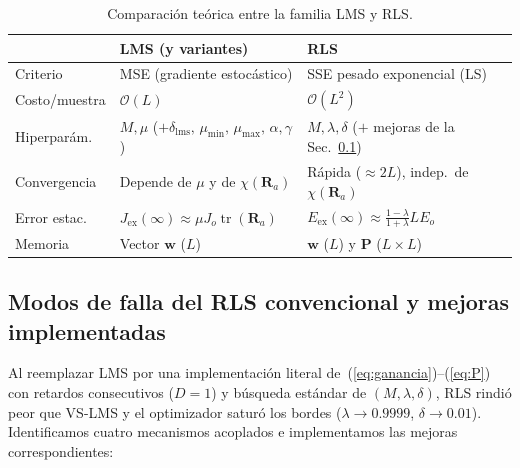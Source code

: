 \documentclass[conference]{IEEEtran}
\begin{document}
\begin{table}[!t]
    \centering
    \caption{Comparación teórica entre la familia LMS y RLS.}
    \label{tab:comparacion}
    \footnotesize
    \setlength{\tabcolsep}{2.5pt}
    \begin{tabular}{@{}lp{2.80cm}p{2.95cm}@{}}
        \toprule
        & \textbf{LMS (y variantes)} & \textbf{RLS} \tabularnewline
        \midrule
        Criterio & {\raggedright MSE (gradiente estocástico)} & {\raggedright SSE pesado exponencial (LS)} \tabularnewline
        Costo/muestra & $\mathcal{O}(L)$ & $\mathcal{O}(L^2)$ \tabularnewline
        Hiperparám. & {\raggedright $M,\mu$ ($+\delta_{\text{lms}},\allowbreak\,\mu_{\min},\allowbreak\,\mu_{\max},\allowbreak\,\alpha,\gamma$)} & {\raggedright $M,\lambda,\delta$ ($+$ mejoras de la Sec.~\ref{sec:rls_impl})} \tabularnewline
        Convergencia & {\raggedright Depende de $\mu$ y de $\chi(\mathbf{R}_a)$} & {\raggedright Rápida ($\approx 2L$), indep.\ de $\chi(\mathbf{R}_a)$} \tabularnewline
        Error estac. & {\raggedright $J_{\text{ex}}(\infty)\approx\mu J_o\operatorname{tr}(\mathbf{R}_a)$} & {\raggedright $E_{\text{ex}}(\infty)\approx\frac{1-\lambda}{1+\lambda}LE_o$} \tabularnewline
        Memoria & Vector $\mathbf{w}$ ($L$) & $\mathbf{w}$ ($L$) y $\mathbf{P}$ ($L{\times}L$) \tabularnewline
        \bottomrule
    \end{tabular}
\end{table}

\subsection{Modos de falla del RLS convencional y mejoras implementadas}
\label{sec:rls_impl}

Al reemplazar LMS por una implementación literal de~(\ref{eq:ganancia})--(\ref{eq:P}) con retardos consecutivos ($D=1$) y búsqueda estándar de $(M,\lambda,\delta)$, RLS rindió peor que VS-LMS y el optimizador saturó los bordes ($\lambda\to 0.9999$, $\delta\to 0.01$). Identificamos cuatro mecanismos acoplados e implementamos las mejoras correspondientes:
\end{document}
